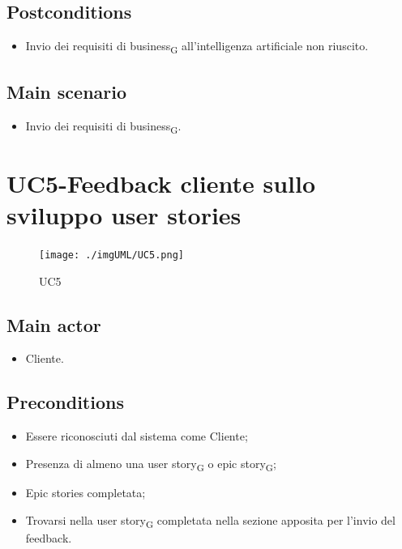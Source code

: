 \documentclass{article}
\begin{document}
     \subsection*{Postconditions} 
        \begin{itemize}
            \item Invio dei requisiti di business\textsubscript{G} all'intelligenza artificiale non riuscito.
        \end{itemize}
        \subsection*{Main scenario}
        \begin{itemize}
        \item Invio dei requisiti di business\textsubscript{G}.
        \end{itemize}


\section{UC5-Feedback cliente sullo sviluppo user stories}
    \begin{figure}[h]
      \centering
      \texttt{[image: ./imgUML/UC5.png]}
        \caption{UC5}
      \label{fig:UC5}
    \end{figure}
    
    \subsection*{Main actor}
    \begin{itemize}
        \item Cliente.
    \end{itemize}
    
    \subsection*{Preconditions}
    \begin{itemize}
        \item Essere riconosciuti dal sistema come Cliente;
        \item Presenza di almeno una user story\textsubscript{G}  o epic story\textsubscript{G};
        \item Epic stories completata;
        \item Trovarsi nella user story\textsubscript{G} completata nella sezione apposita per l'invio del feedback.
    \end{itemize}
    
\end{document}
